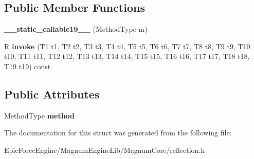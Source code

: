 \subsection*{Public Member Functions}
\begin{DoxyCompactItemize}
\item 
{\bfseries \+\_\+\+\_\+static\+\_\+callable19\+\_\+\+\_\+} (Method\+Type m)\hypertarget{structagm_1_1reflection_1_1____static__callable19_____afd81e367e900e2326e7de69fa071e978}{}\label{structagm_1_1reflection_1_1____static__callable19_____afd81e367e900e2326e7de69fa071e978}

\item 
R {\bfseries invoke} (T1 t1, T2 t2, T3 t3, T4 t4, T5 t5, T6 t6, T7 t7, T8 t8, T9 t9, T10 t10, T11 t11, T12 t12, T13 t13, T14 t14, T15 t15, T16 t16, T17 t17, T18 t18, T19 t19) const \hypertarget{structagm_1_1reflection_1_1____static__callable19_____a8e3864f292312173192e3b36f501ba42}{}\label{structagm_1_1reflection_1_1____static__callable19_____a8e3864f292312173192e3b36f501ba42}

\end{DoxyCompactItemize}
\subsection*{Public Attributes}
\begin{DoxyCompactItemize}
\item 
Method\+Type {\bfseries method}\hypertarget{structagm_1_1reflection_1_1____static__callable19_____a244d3d8606f771742d41aa5e74556543}{}\label{structagm_1_1reflection_1_1____static__callable19_____a244d3d8606f771742d41aa5e74556543}

\end{DoxyCompactItemize}


The documentation for this struct was generated from the following file\+:\begin{DoxyCompactItemize}
\item 
Epic\+Force\+Engine/\+Magnum\+Engine\+Lib/\+Magnum\+Core/reflection.\+h\end{DoxyCompactItemize}
